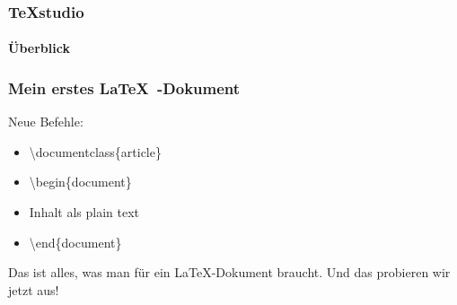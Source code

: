 
\begin{frame}
\frametitle{TeXstudio}
\framesubtitle{\"Uberblick}
\end{frame}




\begin{frame}
\frametitle{Mein erstes \LaTeX~-Dokument}
\begin{block}{Neue Befehle:}
\begin{itemize}
\item \begin{ttfamily}\color{nounibaredII}\textbackslash documentclass\color{nounibagreenI}\color{black}\{article\}\end{ttfamily}
\item \begin{ttfamily}\color{unibablueI}\textbackslash begin\color{black}\{document\}\end{ttfamily}
\item \begin{ttfamily} Inhalt als plain text \end{ttfamily}
\item \begin{ttfamily}\color{unibablueI}\textbackslash end\color{black}\{document\}\end{ttfamily}
\end{itemize}
\end{block}
Das ist alles, was man für ein \LaTeX -Dokument braucht. Und das probieren wir jetzt aus!

\end{frame}

